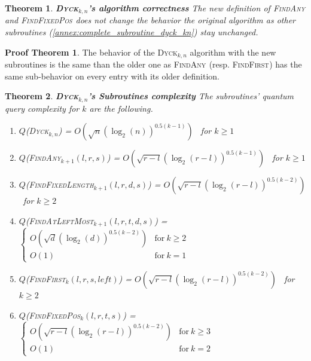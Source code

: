 \documentclass[11pt,a4paper]{article}
\newcommand{\Dyck}[1]{\textsc{Dyck$_{#1}$}}
\newcommand{\FA}[1]{\textsc{FindAny$_{#1}$}}
\newcommand{\FFL}[1]{\textsc{FindFixedLength$_{#1}$}}
\newcommand{\FFP}[1]{\textsc{FindFixedPos$_{#1}$}}
\newcommand{\FALM}[1]{\textsc{FindAtLeftMost$_{#1}$}}
\newcommand{\FF}[1]{\textsc{FindFirst$_{#1}$}}
\theoremstyle{definition}
\theoremstyle{plain}
\newtheorem{theorem}{Theorem}[section]
\theoremstyle{definition}
\newtheorem{tproof}{Proof Theorem}[section]
\begin{document}
\begin{theorem}{\textbf{\Dyck{k,n}'s algorithm correctness}} \label{th:subroutine_correctness}
    The new definition of \FA{} and \FFP{} does not change the behavior the original algorithm
    as other subroutines (\autoref{annex:complete_subroutine_dyck_kn}) stay unchanged.
\end{theorem}

\begin{tproof}
    The behavior of the \Dyck{k,n} algorithm with the new subroutines is the same than the older
    one as \FA{} (resp. \FF{}) has the same sub-behavior on every entry with its
    older definition.
\end{tproof}

\begin{theorem}{\textbf{\Dyck{k,n}'s Subroutines complexity}} \label{th:subroutine_complexity}
    The subroutines' quantum query complexity for $k$ are the following.
    \begin{enumerate}
        \item $Q$(\Dyck{k,n}) = $O\left(\sqrt{n}(\log_2(n))^{0.5(k-1)}\right)$ \ for $k \geq 1$
        \item $Q$(\FA{k+1}$(l,r,s)$) = $O\left(\sqrt{r-l}(\log_2(r-l))^{0.5(k-1)}\right)$ \ for $k \geq 1$
        \item $Q$(\FFL{k+1}$(l,r,d,s)$) = $O\left(\sqrt{r-l}(\log_2(r-l))^{0.5(k-2)}\right)$ \ for $k \geq 2$
        \item $Q$(\FALM{k+1}$(l, r, t, d, s)$) = $\left\{
                  \begin{array}{ll}
                      O\left(\sqrt{d}(\log_2(d))^{0.5(k-2)}\right) & \textrm{for} \ k \geq 2 \\
                      O(1)                                         & \textrm{for} \  k = 1
                  \end{array}
                  \right.$
        \item $Q$(\FF{k}$(l,r,s, left)$) = $O\left(\sqrt{r-l}(\log_2(r-l))^{0.5(k-2)}\right)$ \ for $k \geq 2$
        \item $Q$(\FFP{k}$(l,r,t,s)$) = $\left\{ \begin{array}{ll}
                      O\left(\sqrt{r-l}(\log_2(r-l))^{0.5(k-2)}\right) & \textrm{for} \ k \geq 3 \\
                      O(1)                                             & \textrm{for} \ k = 2
                  \end{array}
                  \right.$
    \end{enumerate}
\end{theorem}
\end{document}
